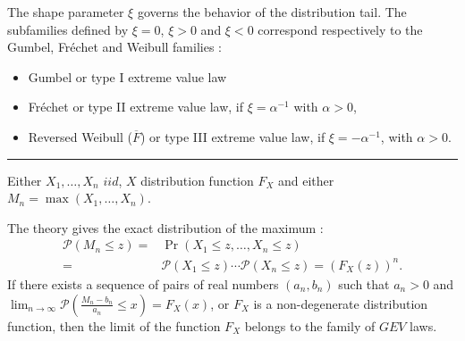 \begin{f}

The shape parameter $\xi$ governs the behavior of the distribution tail.
The subfamilies defined by $\xi= 0$, $\xi>0$ and $\xi<0$ correspond respectively to the Gumbel, Fréchet and Weibull families :
\begin{itemize}
\item 	 Gumbel or type I extreme value law
\item     Fréchet or type II extreme value law, if $\xi  = \alpha^{-1}$ with $\alpha>0$,
\item    Reversed Weibull ($\overline{F}$) or type III extreme value law, if $\xi =-\alpha^{-1} $, with $\alpha>0$.
\end{itemize}
\end{f}
\hrule 

\begin{f} 

	Either $X_1, \dots, X_n$  $iid$, $X$ distribution function $F_X$ and either $M_n =\max(X_1,\dots,X_n)$.
	
	The theory gives the exact distribution of the maximum :
\begin{align*}
		\mathcal{P}(M_n \leq z) = &\Pr(X_1 \leq z, \dots, X_n \leq z) \\
		 = &\mathcal{P}(X_1 \leq z) \cdots \mathcal{P}(X_n \leq z) = (F_X(z))^n. 
\end{align*}
	If there exists a sequence of pairs of real numbers $(a_n, b_n)$ such that $a_n>0$ and $\lim_{n \to \infty}\mathcal{P}\left(\frac{M_n-b_n}{a_n}\leq x\right) = F_X(x)$, or $F_X$ is a non-degenerate distribution function, then the limit of the function $F_X$ belongs to the family of $GEV$ laws. 

\end{f}

